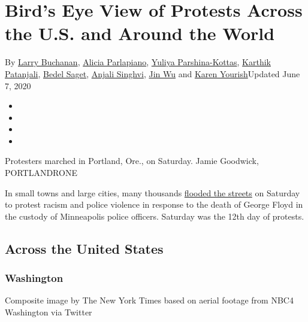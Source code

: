 \hypertarget{birds-eye-view-of-protests-across-the-us-and-around-the-world}{%
\section{Bird's Eye View of Protests Across the U.S. and Around the
World}\label{birds-eye-view-of-protests-across-the-us-and-around-the-world}}

By \href{https://www.nytimes3xbfgragh.onion/by/larry-buchanan}{Larry
Buchanan},
\href{https://www.nytimes3xbfgragh.onion/by/alicia-parlapiano}{Alicia
Parlapiano},
\href{https://www.nytimes3xbfgragh.onion/by/yuliya-parshina-kottas}{Yuliya
Parshina-Kottas},
\href{https://www.nytimes3xbfgragh.onion/by/karthik-patanjali}{Karthik
Patanjali},
\href{https://www.nytimes3xbfgragh.onion/by/bedel-saget}{Bedel Saget},
\href{https://www.nytimes3xbfgragh.onion/by/anjali-singhvi}{Anjali
Singhvi}, \href{https://www.nytimes3xbfgragh.onion/by/jin-wu}{Jin Wu}
and \href{https://www.nytimes3xbfgragh.onion/by/karen-yourish}{Karen
Yourish}Updated June 7, 2020

\begin{itemize}
\item
\item
\item
\item
\end{itemize}

Protesters marched in Portland, Ore., on Saturday. \textbar{} Jamie
Goodwick, PORTLANDRONE

In small towns and large cities, many thousands
\href{https://www.nytimes3xbfgragh.onion/2020/06/06/us/protests-today-police-george-floyd.html}{flooded
the streets} on Saturday to protest racism and police violence in
response to the death of George Floyd in the custody of Minneapolis
police officers. Saturday was the 12th day of protests.

\hypertarget{across-the-united-states}{%
\subsection{Across the United States}\label{across-the-united-states}}

\hypertarget{washington}{%
\subsubsection{Washington}\label{washington}}

Composite image by The New York Times based on aerial footage from NBC4
Washington via Twitter

